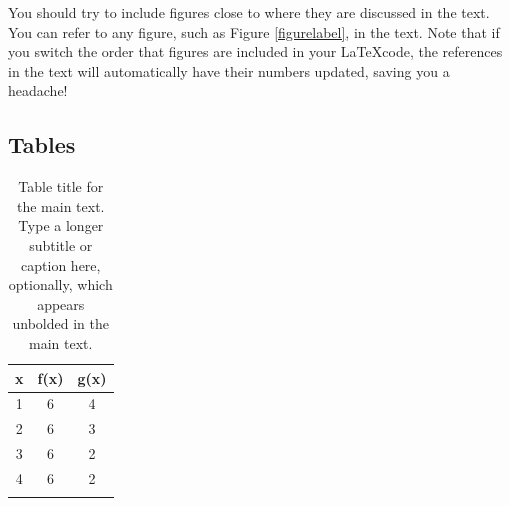 You should try to include figures close to where they are discussed in the text. You can refer to any figure, such as Figure \ref{figurelabel}, in the text. Note that if you switch the order that figures are included in your \LaTeX code, the references in the text will automatically have their numbers updated, saving you a headache!

\subsection{Tables}

\begin{table}
\caption[Table title for the Table of Contents]{ 
    Table title for the main text. %
    \textmd{Type a longer subtitle or caption here, optionally, which appears unbolded in the main text.}
    }\begin{center}
\begin{tabular}{ccc}
x & f(x) & g(x) \\
\hline
1 & 6 & 4  \\
2 & 6 & 3  \\
3 & 6 & 2  \\
4 & 6 & 2  \\
\label{Table in Chapter 1}
\end{tabular}
\end{center}
\end{table}

